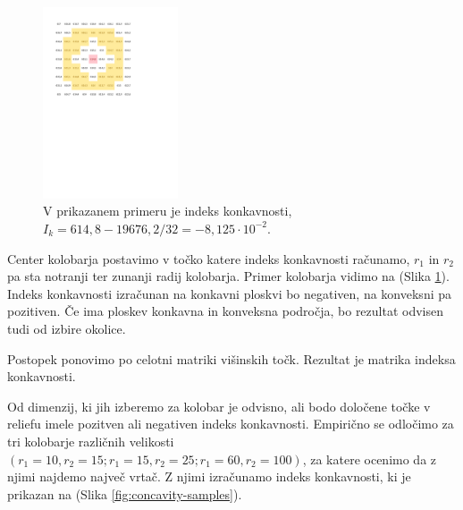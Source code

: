 \documentclass[a4paper, twoside, 12pt]{book}
\begin{document}
  \begin{figure}[h!]
    \begin{center}
      \includegraphics[width=4cm]{slike/concavity-ring-visualisation-2}
    \end{center}
    \caption{V prikazanem primeru je indeks konkavnosti, $I_k = 614,8 - 19676,2/32 = - 8,125 \cdot 10^{-2}$.}
    \label{fig:concavity-ring}
  \end{figure}

Center kolobarja postavimo v točko katere indeks konkavnosti računamo, $r_1$ in $r_2$ pa sta notranji ter zunanji radij kolobarja.
Primer kolobarja vidimo na (Slika \ref{fig:concavity-ring}). Indeks konkavnosti izračunan na konkavni ploskvi bo negativen, na konveksni pa pozitiven. Če ima ploskev konkavna in konveksna področja, bo rezultat odvisen tudi od izbire okolice.

Postopek ponovimo po celotni matriki višinskih točk. Rezultat je matrika indeksa konkavnosti.

Od dimenzij, ki jih izberemo za kolobar je odvisno, ali bodo določene točke v reliefu imele pozitven ali negativen indeks konkavnosti. Empirično se odločimo za tri kolobarje različnih velikosti $(r_1=10,r_2=15;r_1=15,r_2=25;r_1=60,r_2=100)$, za katere ocenimo da z njimi najdemo največ vrtač. Z njimi izračunamo indeks konkavnosti, ki je prikazan na (Slika \ref{fig:concavity-samples}).
\end{document}
